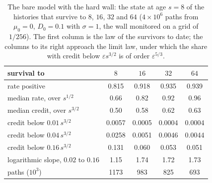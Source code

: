 \begin{table}[ht]
\centering\small
\begin{tabular}{@{}lcccc@{}}
\toprule
survival to & $8$ & $16$ & $32$ & $64$\\
\midrule
rate positive & 0.815 & 0.918 & 0.935 & 0.939\\
median rate, over $s^{1/2}$ & 0.66 & 0.82 & 0.92 & 0.96\\
median credit, over $s^{3/2}$ & 0.50 & 0.58 & 0.62 & 0.63\\
credit below $0.01\,s^{3/2}$ & 0.0057 & 0.0005 & 0.0004 & 0.0004\\
credit below $0.04\,s^{3/2}$ & 0.0258 & 0.0051 & 0.0046 & 0.0044\\
credit below $0.16\,s^{3/2}$ & 0.131 & 0.060 & 0.053 & 0.051\\
logarithmic slope, $0.02$ to $0.16$ & 1.15 & 1.74 & 1.72 & 1.73\\
paths ($10^3$) & 1173 & 983 & 825 & 693\\
\bottomrule
\end{tabular}
\caption{\small The bare model with the hard wall: the state at age
$s=8$ of the histories that survive to $8$, $16$, $32$ and $64$
($4\times10^6$ paths from $\mu_0=0$, $D_0=0.1$ with $\sigma=1$, the wall
monitored on a grid of $1/256$). The first column is the law of the
survivors to date; the columns to its right approach the limit law, under
which the share with credit below $\varepsilon s^{3/2}$ is of order
$\varepsilon^{5/3}$.}
\label{gr:tab:bare}
\end{table}

